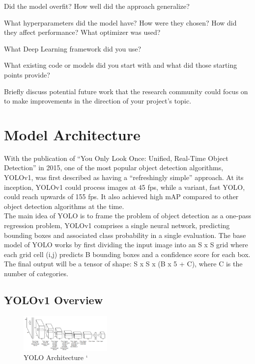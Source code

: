 \documentclass[10pt,twocolumn,letterpaper]{article}
\begin{document}
Did the model overfit? How well did the approach generalize? 

What hyperparameters did the model have? How were they chosen? How did they affect performance? What optimizer was used? 

What Deep Learning framework did you use? 

What existing code or models did you start with and what did those starting points provide? 

Briefly discuss potential future work that the research community could focus on to make improvements in the direction of your project's topic.

\section{Model Architecture}

With the publication of “You Only Look Once: Unified, Real-Time Object Detection” in 2015, one of the most popular object detection algorithms, YOLOv1, was first described as having a “refreshingly simple” approach. At its inception, YOLOv1 could process images at 45 fps, while a variant, fast YOLO, could reach upwards of 155 fps. It also achieved high mAP compared to other object detection algorithms at the time. \\
The main idea of YOLO is to frame the problem of object detection as a one-pass regression problem, YOLOv1 comprises a single neural network, predicting bounding boxes and associated class probability in a single evaluation. The base model of YOLO works by first dividing the input image into an S x S grid where each grid cell (i,j) predicts B bounding boxes and a confidence score for each box. The final output will be a tensor of shape: S x S x (B x 5 + C), where C is the number of categories.
\subsection{YOLOv1 Overview}

\begin{figure}[h]
    \centering
    \includegraphics[width=0.4\textwidth]{figures/YOLOv1 Architecture.png}
    \caption{YOLO Architecture `\cite{YOLO_OG}}
    \label{fig:my_label}
\end{figure}
\end{document}
